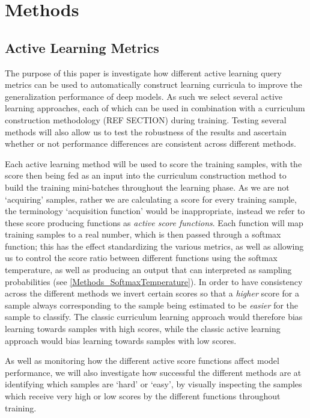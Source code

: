 \chapter{Methods}

\section{Active Learning Metrics}\label{Methods_Active_Learning_Metrics}
The purpose of this paper is investigate how different active learning query metrics can be used to automatically construct learning curricula to improve the generalization performance of deep models. As such we select several active learning approaches, each of which can be used in combination with a curriculum construction methodology (REF SECTION) during training. Testing several methods will also allow us to test the robustness of the results and ascertain whether or not performance differences are consistent across different methods. 

Each active learning method will be used to score the training samples, with the score then being fed as an input into the curriculum construction method to build the training mini-batches throughout the learning phase. As we are not `acquiring' samples, rather we are calculating a score for every training sample, the terminology `acquisition function' would be inappropriate, instead we refer to these score producing functions as \textit{active score functions}.  Each function will map training samples to a real number, which is then passed through a softmax function; this has the effect standardizing the various metrics, as well as allowing us to control the score ratio between different functions using the softmax temperature, as well as producing an output that can interpreted as sampling probabilities (see \ref{Methods_SoftmaxTemperature}). In order to have consistency across the different methods we invert certain scores so that a \textit{higher} score for a sample always corresponding to the sample being estimated to be \textit{easier} for the sample to classify. The classic curriculum learning approach would therefore bias learning towards samples with high scores, while the classic active learning approach would bias learning towards samples with low scores. 

As well as monitoring how the different active score functions affect model performance, we will also investigate how successful the different methods are at identifying which samples are `hard' or `easy', by visually inspecting the samples which receive very high or low scores by the different functions throughout training. 
